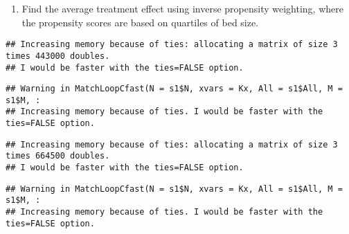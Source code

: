 \documentclass[
]{article}
\newenvironment{Shaded}{\begin{snugshade}}{\end{snugshade}}
\newcommand{\AttributeTok}[1]{\textcolor[rgb]{0.77,0.63,0.00}{#1}}
\newcommand{\DecValTok}[1]{\textcolor[rgb]{0.00,0.00,0.81}{#1}}
\newcommand{\FunctionTok}[1]{\textcolor[rgb]{0.00,0.00,0.00}{#1}}
\newcommand{\NormalTok}[1]{#1}
\newcommand{\OtherTok}[1]{\textcolor[rgb]{0.56,0.35,0.01}{#1}}
\newcommand{\SpecialCharTok}[1]{\textcolor[rgb]{0.00,0.00,0.00}{#1}}
\newcommand{\StringTok}[1]{\textcolor[rgb]{0.31,0.60,0.02}{#1}}
\providecommand{\tightlist}{%
  \setlength{\itemsep}{0pt}\setlength{\parskip}{0pt}}
\begin{document}
\begin{enumerate}
\def\labelenumi{\arabic{enumi}.}
\setcounter{enumi}{4}
\tightlist
\item
  Find the average treatment effect using inverse propensity weighting,
  where the propensity scores are based on quartiles of bed size.
\end{enumerate}

\begin{Shaded}
\end{Shaded}

\begin{verbatim}
## Increasing memory because of ties: allocating a matrix of size 3 times 443000 doubles.
## I would be faster with the ties=FALSE option.
\end{verbatim}

\begin{verbatim}
## Warning in MatchLoopCfast(N = s1$N, xvars = Kx, All = s1$All, M = s1$M, :
## Increasing memory because of ties. I would be faster with the ties=FALSE option.
\end{verbatim}

\begin{verbatim}
## Increasing memory because of ties: allocating a matrix of size 3 times 664500 doubles.
## I would be faster with the ties=FALSE option.
\end{verbatim}

\begin{verbatim}
## Warning in MatchLoopCfast(N = s1$N, xvars = Kx, All = s1$All, M = s1$M, :
## Increasing memory because of ties. I would be faster with the ties=FALSE option.
\end{verbatim}
\end{document}
